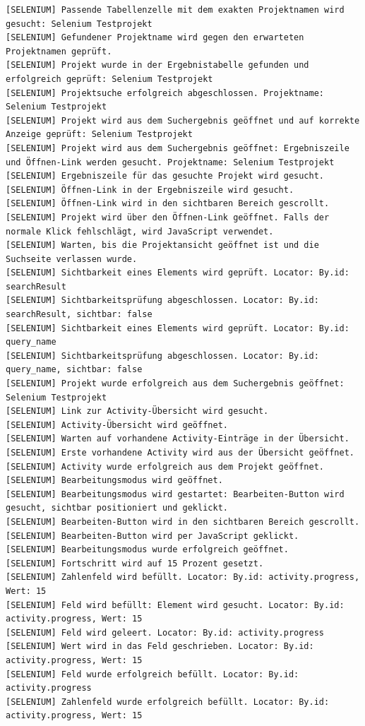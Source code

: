 \begin{lstlisting}[caption={Selenium -- Activity bearbeiten (Erfolgreich)}, label={lst:sel_edit_act_ok}, style=logStyle]
[SELENIUM] Passende Tabellenzelle mit dem exakten Projektnamen wird gesucht: Selenium Testprojekt
[SELENIUM] Gefundener Projektname wird gegen den erwarteten Projektnamen geprüft.
[SELENIUM] Projekt wurde in der Ergebnistabelle gefunden und erfolgreich geprüft: Selenium Testprojekt
[SELENIUM] Projektsuche erfolgreich abgeschlossen. Projektname: Selenium Testprojekt
[SELENIUM] Projekt wird aus dem Suchergebnis geöffnet und auf korrekte Anzeige geprüft: Selenium Testprojekt
[SELENIUM] Projekt wird aus dem Suchergebnis geöffnet: Ergebniszeile und Öffnen-Link werden gesucht. Projektname: Selenium Testprojekt
[SELENIUM] Ergebniszeile für das gesuchte Projekt wird gesucht.
[SELENIUM] Öffnen-Link in der Ergebniszeile wird gesucht.
[SELENIUM] Öffnen-Link wird in den sichtbaren Bereich gescrollt.
[SELENIUM] Projekt wird über den Öffnen-Link geöffnet. Falls der normale Klick fehlschlägt, wird JavaScript verwendet.
[SELENIUM] Warten, bis die Projektansicht geöffnet ist und die Suchseite verlassen wurde.
[SELENIUM] Sichtbarkeit eines Elements wird geprüft. Locator: By.id: searchResult
[SELENIUM] Sichtbarkeitsprüfung abgeschlossen. Locator: By.id: searchResult, sichtbar: false
[SELENIUM] Sichtbarkeit eines Elements wird geprüft. Locator: By.id: query_name
[SELENIUM] Sichtbarkeitsprüfung abgeschlossen. Locator: By.id: query_name, sichtbar: false
[SELENIUM] Projekt wurde erfolgreich aus dem Suchergebnis geöffnet: Selenium Testprojekt
[SELENIUM] Link zur Activity-Übersicht wird gesucht.
[SELENIUM] Activity-Übersicht wird geöffnet.
[SELENIUM] Warten auf vorhandene Activity-Einträge in der Übersicht.
[SELENIUM] Erste vorhandene Activity wird aus der Übersicht geöffnet.
[SELENIUM] Activity wurde erfolgreich aus dem Projekt geöffnet.
[SELENIUM] Bearbeitungsmodus wird geöffnet.
[SELENIUM] Bearbeitungsmodus wird gestartet: Bearbeiten-Button wird gesucht, sichtbar positioniert und geklickt.
[SELENIUM] Bearbeiten-Button wird in den sichtbaren Bereich gescrollt.
[SELENIUM] Bearbeiten-Button wird per JavaScript geklickt.
[SELENIUM] Bearbeitungsmodus wurde erfolgreich geöffnet.
[SELENIUM] Fortschritt wird auf 15 Prozent gesetzt.
[SELENIUM] Zahlenfeld wird befüllt. Locator: By.id: activity.progress, Wert: 15
[SELENIUM] Feld wird befüllt: Element wird gesucht. Locator: By.id: activity.progress, Wert: 15
[SELENIUM] Feld wird geleert. Locator: By.id: activity.progress
[SELENIUM] Wert wird in das Feld geschrieben. Locator: By.id: activity.progress, Wert: 15
[SELENIUM] Feld wurde erfolgreich befüllt. Locator: By.id: activity.progress
[SELENIUM] Zahlenfeld wurde erfolgreich befüllt. Locator: By.id: activity.progress, Wert: 15

\end{lstlisting}

